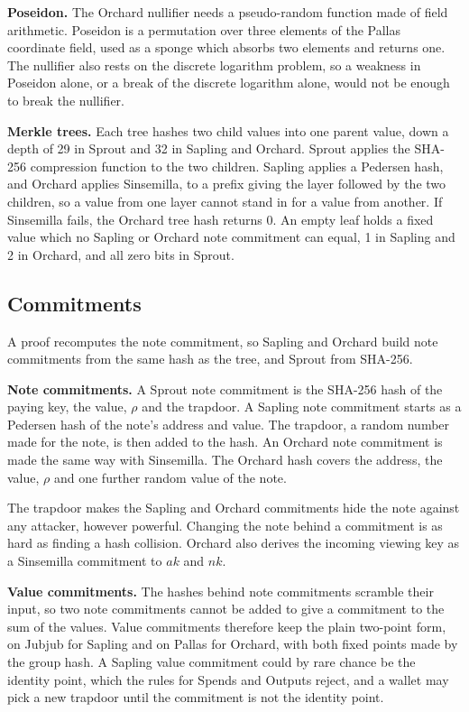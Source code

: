 \documentclass{article}
\newcommand{\lsubsection}[2]{\def\sectionlabel{#2} \subsection{#1}\label{#2}}
\theoremstyle{labelledtheorem} %
\begin{document}
\textbf{Poseidon.} The Orchard nullifier needs a pseudo-random function made of field arithmetic. Poseidon is a permutation over three elements of the Pallas coordinate field, used as a sponge which absorbs two elements and returns one. The nullifier also rests on the discrete logarithm problem, so a weakness in Poseidon alone, or a break of the discrete logarithm alone, would not be enough to break the nullifier.

\textbf{Merkle trees.} Each tree hashes two child values into one parent value, down a depth of 29 in Sprout and 32 in Sapling and Orchard. Sprout applies the SHA-256 compression function to the two children. Sapling applies a Pedersen hash, and Orchard applies Sinsemilla, to a prefix giving the layer followed by the two children, so a value from one layer cannot stand in for a value from another. If Sinsemilla fails, the Orchard tree hash returns 0. An empty leaf holds a fixed value which no Sapling or Orchard note commitment can equal, 1 in Sapling and 2 in Orchard, and all zero bits in Sprout.

\lsubsection{Commitments}{readablecommitments}

A proof recomputes the note commitment, so Sapling and Orchard build note commitments from the same hash as the tree, and Sprout from SHA-256.

\textbf{Note commitments.} A Sprout note commitment is the SHA-256 hash of the paying key, the value, $\rho$ and the trapdoor. A Sapling note commitment starts as a Pedersen hash of the note's address and value. The trapdoor, a random number made for the note, is then added to the hash. An Orchard note commitment is made the same way with Sinsemilla. The Orchard hash covers the address, the value, $\rho$ and one further random value of the note.

The trapdoor makes the Sapling and Orchard commitments hide the note against any attacker, however powerful. Changing the note behind a commitment is as hard as finding a hash collision. Orchard also derives the incoming viewing key as a Sinsemilla commitment to $\mathit{ak}$ and $\mathit{nk}$.

\textbf{Value commitments.} The hashes behind note commitments scramble their input, so two note commitments cannot be added to give a commitment to the sum of the values. Value commitments therefore keep the plain two-point form, on Jubjub for Sapling and on Pallas for Orchard, with both fixed points made by the group hash. A Sapling value commitment could by rare chance be the identity point, which the rules for Spends and Outputs reject, and a wallet may pick a new trapdoor until the commitment is not the identity point.
\end{document}
